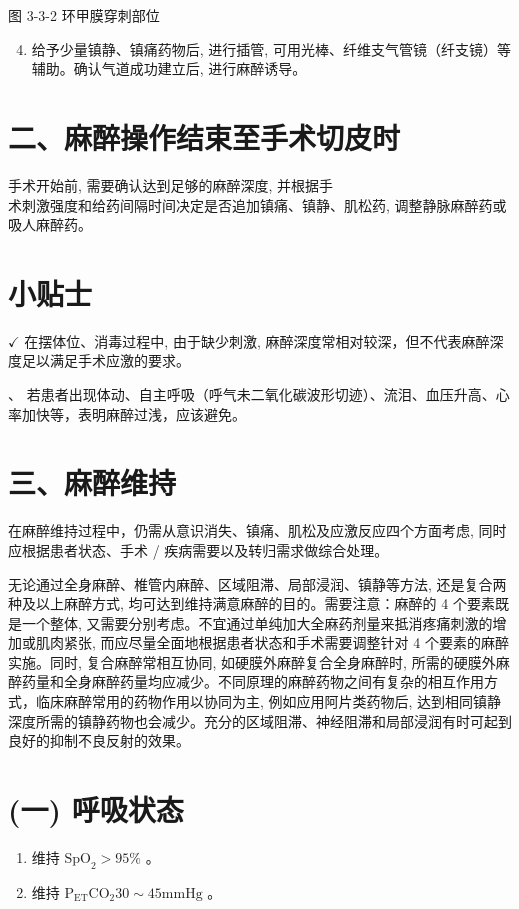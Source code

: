\documentclass[10pt]{article}
\begin{document}
图 3-3-2 环甲膜穿刺部位

\begin{enumerate}
  \setcounter{enumi}{3}
  \item 给予少量镇静、镇痛药物后, 进行插管, 可用光棒、纤维支气管镜（纤支镜）等辅助。确认气道成功建立后, 进行麻醉诱导。
\end{enumerate}

\section*{二、麻醉操作结束至手术切皮时}
手术开始前, 需要确认达到足够的麻醉深度, 并根据手\\
术刺激强度和给药间隔时间决定是否追加镇痛、镇静、肌松药, 调整静脉麻醉药或吸人麻醉药。

\section*{小贴士}
$\checkmark$ 在摆体位、消毒过程中, 由于缺少刺激, 麻醉深度常相对较深，但不代表麻醉深度足以满足手术应激的要求。

$、$ 若患者出现体动、自主呼吸（呼气未二氧化碳波形切迹）、流泪、血压升高、心率加快等，表明麻醉过浅，应该避免。

\section*{三、麻醉维持}
在麻醉维持过程中，仍需从意识消失、镇痛、肌松及应激反应四个方面考虑, 同时应根据患者状态、手术 / 疾病需要以及转归需求做综合处理。

无论通过全身麻醉、椎管内麻醉、区域阻滞、局部浸润、镇静等方法, 还是复合两种及以上麻醉方式, 均可达到维持满意麻醉的目的。需要注意：麻醉的 4 个要素既是一个整体, 又需要分别考虑。不宜通过单纯加大全麻药剂量来抵消疼痛刺激的增加或肌肉紧张, 而应尽量全面地根据患者状态和手术需要调整针对 4 个要素的麻醉实施。同时, 复合麻醉常相互协同, 如硬膜外麻醉复合全身麻醉时, 所需的硬膜外麻醉药量和全身麻醉药量均应减少。不同原理的麻醉药物之间有复杂的相互作用方式，临床麻醉常用的药物作用以协同为主, 例如应用阿片类药物后, 达到相同镇静深度所需的镇静药物也会减少。充分的区域阻滞、神经阻滞和局部浸润有时可起到良好的抑制不良反射的效果。

\section*{(一) 呼吸状态}
\begin{enumerate}
  \item 维持 $\mathrm{SpO}_{2}>95 \%$ 。

  \item 维持 $\mathrm{P}_{\mathrm{ET}} \mathrm{CO}_{2} 30 \sim 45 \mathrm{mmHg}$ 。

\end{enumerate}
\end{document}
